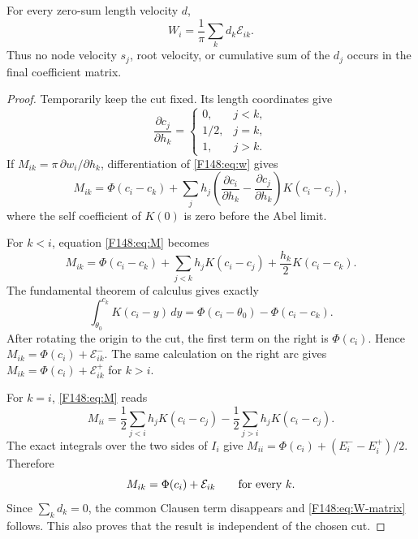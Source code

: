 \begin{theorem}
\label{F148:thm:matrix}
For every zero-sum length velocity $d$,
\begin{equation}\label{F148:eq:W-matrix}
 \boxed{W_i=\frac1\pi\sum_k d_k\mathscr E_{ik}.}
\end{equation}
Thus no node velocity $s_j$, root velocity, or cumulative sum of the
$d_j$ occurs in the final coefficient matrix.
\end{theorem}

\begin{proof}
Temporarily keep the cut fixed.  Its length coordinates give
\begin{equation*}
 \frac{\partial c_j}{\partial h_k}=
 \begin{cases}0,&j<k,\\1/2,&j=k,\\1,&j>k.
 \end{cases}
\end{equation*}
If $M_{ik}=\pi\,\partial w_i/\partial h_k$, differentiation of
\eqref{F148:eq:w} gives
\begin{equation}\label{F148:eq:M}
 M_{ik}=\Phi(c_i-c_k)+\sum_jh_j
 \left(\frac{\partial c_i}{\partial h_k}
       -\frac{\partial c_j}{\partial h_k}\right)K(c_i-c_j),
\end{equation}
where the self coefficient of $K(0)$ is zero before the Abel limit.

For $k<i$, equation \eqref{F148:eq:M} becomes
\begin{equation*}
 M_{ik}=\Phi(c_i-c_k)+\sum_{j<k}h_jK(c_i-c_j)
                    +\frac{h_k}{2}K(c_i-c_k).
\end{equation*}
The fundamental theorem of calculus gives exactly
\begin{equation*}
 \int_{\theta_0}^{c_k}K(c_i-y)\,dy
 =\Phi(c_i-\theta_0)-\Phi(c_i-c_k).
\end{equation*}
After rotating the origin to the cut, the first term on the right is
$\Phi(c_i)$.  Hence
$M_{ik}=\Phi(c_i)+\mathscr E_{ik}^-$.  The same calculation on the
right arc gives
$M_{ik}=\Phi(c_i)+\mathscr E_{ik}^+$ for $k>i$.

For $k=i$, \eqref{F148:eq:M} reads
\begin{equation*}
 M_{ii}=\frac12\sum_{j<i}h_jK(c_i-c_j)
       -\frac12\sum_{j>i}h_jK(c_i-c_j).
\end{equation*}
The exact integrals over the two sides of $I_i$ give
$M_{ii}=\Phi(c_i)+(E_i^--E_i^+)/2$.  Therefore
\begin{equation*}
 M_{ik}=\Phi(c_i)+\mathscr E_{ik}\qquad\hbox{for every }k.
\end{equation*}
Since $\sum_kd_k=0$, the common Clausen term disappears and
\eqref{F148:eq:W-matrix} follows.  This also proves that the result is
independent of the chosen cut.
\end{proof}

